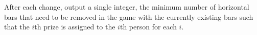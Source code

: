 
	After each change, output a single integer, the minimum number of horizontal bars that need to be
				removed in the game with the currently existing bars such that the $i$th prize is assigned to the $i$th person for each $i$.
